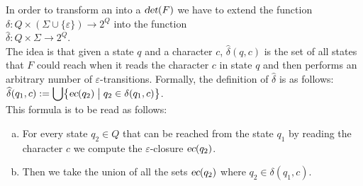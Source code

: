 \noindent
In order to transform an  into a  
$\textsl{det}(F)$ we have to extend the function $\delta:Q  \times (\Sigma \cup \{\varepsilon\}) \rightarrow 2^Q$ into the function
\\[0.2cm]
\hspace*{1.3cm}
$\widehat{\delta}: Q \times \Sigma \rightarrow 2^Q$.
\\[0.2cm]
The idea is that given a state $q$ and a character $c$,  $\widehat{\delta}(q,c)$ is the set of all states that 
$F$ could reach when it reads the character $c$ in state $q$ and then performs an arbitrary number
of $\varepsilon$-transitions.  Formally, the definition of $\widehat{\delta}$ is as follows:
\\[0.2cm]
\hspace*{1.3cm}
$\displaystyle \widehat{\delta}(q_1, c) := \bigcup \bigl\{ \textsl{ec}(q_2) \bigm| q_2 \in \delta(q_1, c) \bigr \}$.
\\[0.2cm]
This formula is to be read as follows:
\begin{enumerate}[(a)]
\item For every state $q_2 \in Q$ that can be reached from the state $q_1$ by reading the character $c$ we
      compute the $\varepsilon$-closure $\textsl{ec}(q_2)$.
\item Then we take the union of all the sets $\textsl{ec}(q_2)$ where $q_2 \in \delta(q_1, c)$.
\end{enumerate}

